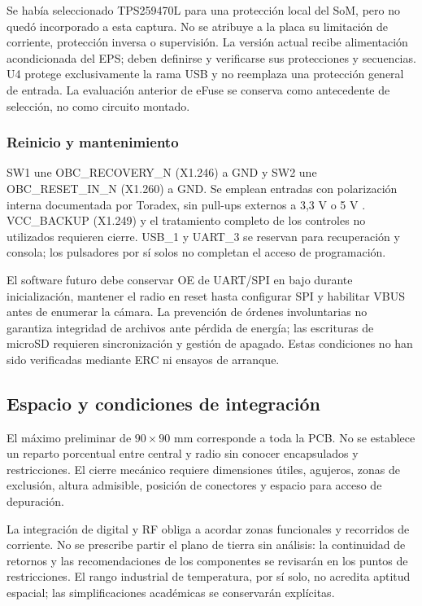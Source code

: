 \documentclass[11pt,letterpaper]{article}
\begin{document}
Se había seleccionado TPS259470L para una protección local del SoM, pero no quedó incorporado a esta captura. No se atribuye a la placa su limitación de corriente, protección inversa o supervisión. La versión actual recibe alimentación acondicionada del EPS; deben definirse y verificarse sus protecciones y secuencias. U4 protege exclusivamente la rama USB y no reemplaza una protección general de entrada. La evaluación anterior de eFuse se conserva como antecedente de selección, no como circuito montado.

\subsubsection{Reinicio y mantenimiento}
SW1 une OBC\_RECOVERY\_N (X1.246) a GND y SW2 une OBC\_RESET\_IN\_N (X1.260) a GND. Se emplean entradas con polarización interna documentada por Toradex, sin pull-ups externos a 3,3 V o 5 V \cite{verdinds}. VCC\_BACKUP (X1.249) y el tratamiento completo de los controles no utilizados requieren cierre. USB\_1 y UART\_3 se reservan para recuperación y consola; los pulsadores por sí solos no completan el acceso de programación.

El software futuro debe conservar OE de UART/SPI en bajo durante inicialización, mantener el radio en reset hasta configurar SPI y habilitar VBUS antes de enumerar la cámara. La prevención de órdenes involuntarias no garantiza integridad de archivos ante pérdida de energía; las escrituras de microSD requieren sincronización y gestión de apagado. Estas condiciones no han sido verificadas mediante ERC ni ensayos de arranque.

\subsection{Espacio y condiciones de integración}
El máximo preliminar de $90\times90$ mm corresponde a toda la PCB. No se establece un reparto porcentual entre central y radio sin conocer encapsulados y restricciones. El cierre mecánico requiere dimensiones útiles, agujeros, zonas de exclusión, altura admisible, posición de conectores y espacio para acceso de depuración.

La integración de digital y RF obliga a acordar zonas funcionales y recorridos de corriente. No se prescribe partir el plano de tierra sin análisis: la continuidad de retornos y las recomendaciones de los componentes se revisarán en los puntos de restricciones. El rango industrial de temperatura, por sí solo, no acredita aptitud espacial; las simplificaciones académicas se conservarán explícitas.
\end{document}
